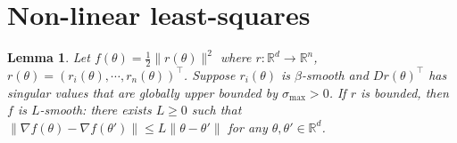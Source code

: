 \documentclass{article} %
\newtheorem{lemma}[theorem]{Lemma}
\newtheorem{proposition}[theorem]{Proposition}
\theoremstyle{definition}
\newcommand{\reals}{\mathbb{R}}
\newcommand{\inner}[2]{\langle #1, #2 \rangle}
\begin{document}
\section{Non-linear least-squares}

\begin{lemma}\label{thm:smooth-surr}
Let $f(\theta) = \frac{1}{2}\|r(\theta)\|^2$ where $r: \reals^d \to \reals^n$, $r(\theta) = (r_i(\theta),\cdots, r_n(\theta))^\top$.
    Suppose  $r_i(\theta)$ is $\beta$-smooth and $Dr(\theta)^\top$ has singular values that are globally upper bounded by $\sigma_{\max} >0$.
    If $r$ is bounded,  then $f$ is $L$-smooth: there exists $L \geq 0$  such that $\|\nabla f(\theta) -\nabla f(\theta')\| \leq L\|\theta -\theta'\|$ for any $\theta, \theta' \in\reals^d$.
\end{lemma}
\end{document}
